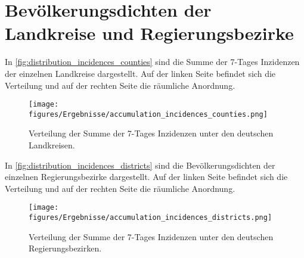 \section{Bevölkerungsdichten der Landkreise und Regierungsbezirke}
In \autoref{fig:distribution_incidences_counties} sind die Summe der 7-Tages Inzidenzen der einzelnen Landkreise dargestellt. Auf der linken Seite befindet sich die Verteilung und auf der rechten Seite die räumliche Anordnung.

\begin{figure}[H]
    \centering
    \texttt{[image: figures/Ergebnisse/accumulation\_incidences\_counties.png]}
    \caption{Verteilung der Summe der 7-Tages Inzidenzen unter den deutschen Landkreisen.}
    \label{fig:distribution_incidences_counties}
\end{figure}

In \autoref{fig:distribution_incidences_districts} sind die Bevölkerungsdichten der einzelnen Regierungsbezirke dargestellt. Auf der linken Seite befindet sich die Verteilung und auf der rechten Seite die räumliche Anordnung.

\begin{figure}[H]
    \centering
    \texttt{[image: figures/Ergebnisse/accumulation\_incidences\_districts.png]}
    \caption{Verteilung der Summe der 7-Tages Inzidenzen unter den deutschen Regierungsbezirken.}
    \label{fig:distribution_incidences_districts}
\end{figure}